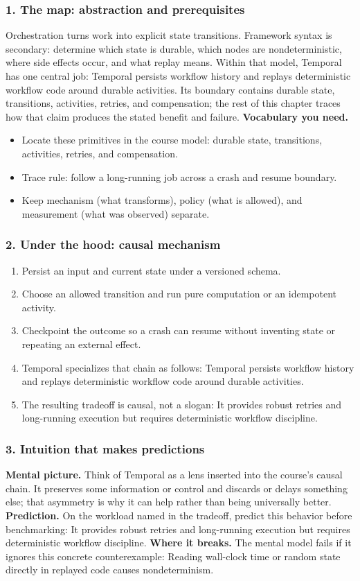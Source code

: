 \subsubsection*{1. The map: abstraction and prerequisites}
Orchestration turns work into explicit state transitions. Framework syntax is secondary: determine which state is durable, which nodes are nondeterministic, where side effects occur, and what replay means.
Within that model, Temporal has one central job: Temporal persists workflow history and replays deterministic workflow code around durable activities. Its boundary contains durable state, transitions, activities, retries, and compensation; the rest of this chapter traces how that claim produces the stated benefit and failure.
\textbf{Vocabulary you need.}\begin{itemize}
\item Locate these primitives in the course model: durable state, transitions, activities, retries, and compensation.
\item Trace rule: follow a long-running job across a crash and resume boundary.
\item Keep mechanism (what transforms), policy (what is allowed), and measurement (what was observed) separate.
\end{itemize}
\subsubsection*{2. Under the hood: causal mechanism}\begin{enumerate}
\item Persist an input and current state under a versioned schema.
\item Choose an allowed transition and run pure computation or an idempotent activity.
\item Checkpoint the outcome so a crash can resume without inventing state or repeating an external effect.
\item Temporal specializes that chain as follows: Temporal persists workflow history and replays deterministic workflow code around durable activities.
\item The resulting tradeoff is causal, not a slogan: It provides robust retries and long-running execution but requires deterministic workflow discipline.
\end{enumerate}
\subsubsection*{3. Intuition that makes predictions}
\textbf{Mental picture.} Think of Temporal as a lens inserted into the course's causal chain. It preserves some information or control and discards or delays something else; that asymmetry is why it can help rather than being universally better.
\textbf{Prediction.} On the workload named in the tradeoff, predict this behavior before benchmarking: It provides robust retries and long-running execution but requires deterministic workflow discipline.
\textbf{Where it breaks.} The mental model fails if it ignores this concrete counterexample: Reading wall-clock time or random state directly in replayed code causes nondeterminism.
